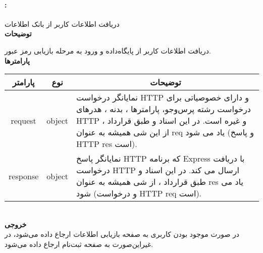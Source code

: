 \paragraph{:}
دریافت اطلاعات کاربر از بانک اطلاعات
\\
\textbf{توضیحات}
\hr
\begin{flushleft}
	\framebox[.9\textwidth][l]{
		\lr{
			\textcolor{type}{void}
			\textcolor{func}{postForgot}
			\textcolor{symb}{(}
			\textcolor{type}{object}
			\textcolor{arg}{request}
			\textcolor{symb}{,}
			\textcolor{type}{object}
			\textcolor{arg}{response}
			\textcolor{symb}{);}
		}
	}
\end{flushleft}
دریافت اطلاعات کاربر از پایگاه‌داده و ورود به مرحله بازیابی رمز عبور.
\\
\textbf{پارامترها}
\hr \\[10pt]
\begin{tabular}{|m{4cm}|m{3cm}|m{10cm}|}
	\hline
	\multicolumn{1}{|c}{پارامتر}
	&
	\multicolumn{1}{|c}{نوع}
	&
	\multicolumn{1}{|c|}{توضیحات}
	\\
	\hline
	\multicolumn{1}{|c}{request}
	&
	\multicolumn{1}{|c|}{object}
	&
	نمایانگر درخواست HTTP و دارای خصوصیاتی برای درخواست رشته پرس‌و‌جو، پارامترها ، بدنه ، هدرهای HTTP و غیره است.
	در این اسناد و طبق قرارداد ، از این شی همیشه به عنوان req یاد می شود (و پاسخ HTTP res است).
	\\
	\hline
	\multicolumn{1}{|c}{response}
	&
	\multicolumn{1}{|c|}{object}
	&
	نمایانگر پاسخ HTTP که برنامه Express با دریافت درخواست HTTP ارسال می کند.
	در این اسناد و طبق قرارداد ، از شی همیشه به عنوان res یاد می شود (و درخواست HTTP req است).
	\\
	\hline
\end{tabular}
\\[10pt]
\textbf{خروجی}
\hr \\
در صورت موجود بودن کاربری به صفحه بازیابی اطلاعات ارجاع داده می‌شود، در غیراین‌صورت به صفحه ثبت‌نام ارجاع داده می‌شود.

